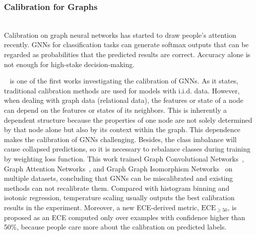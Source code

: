 \subsubsection{Calibration for Graphs}\hfill\\
Calibration on graph neural networks has started to draw people's attention recently. GNNs for classification tasks can generate softmax outputs that can be regarded as probabilities that the predicted results are correct. Accuracy alone is not enough for high-stake decision-making. 

~\cite{teixeira2019graph} is one of the first works investigating the calibration of GNNs. As it states, traditional calibration methods are used for models with i.i.d. data. However, when dealing with graph data (relational data), the features or state of a node can depend on the features or states of its neighbors. This is inherently a dependent structure because the properties of one node are not solely determined by that node alone but also by its context within the graph. This dependence makes the calibration of GNNs challenging. Besides, the class imbalance will cause collapsed predictions, so it is necessary to rebalance classes during training by weighting loss function. This work trained Graph Convolutional Networks~\cite{kipf2016semi}, Graph Attention Networks~\cite{velivckovic2017graph}, and Graph Graph Isomorphism Networks~\cite{xu2018powerful} on multiple datasets, concluding that GNNs can be miscalibrated and existing methods can not recalibrate them. Compared with histogram binning and isotonic regression, temperature scaling usually outputs the best calibration results in the experiment. Moreover, a new ECE-derived metric, $\text{ECE}_{\geq 50}$, is proposed as an ECE computed only over examples with confidence higher than 50\%, because people care more about the calibration on predicted labels.

